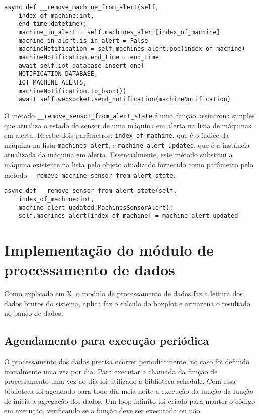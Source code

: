 \begin{verbatim}
async def __remove_machine_from_alert(self,
    index_of_machine:int,
    end_time:datetime):
    machine_in_alert = self.machines_alert[index_of_machine]
    machine_in_alert.is_in_alert = False
    machineNotification = self.machines_alert.pop(index_of_machine)
    machineNotification.end_time = end_time
    await self.iot_database.insert_one(
    NOTIFICATION_DATABASE,
    IOT_MACHINE_ALERTS,
    machineNotification.to_bson())
    await self.websocket.send_notification(machineNotification)    
\end{verbatim}

O método \texttt{\_\_remove\_sensor\_from\_alert\_state} é uma função assíncrona simples que atualiza o estado do sensor de uma máquina em alerta na lista de máquinas em alerta. Recebe dois parâmetros: \texttt{index\_of\_machine}, que é o índice da máquina na lista \texttt{machines\_alert}, e \texttt{machine\_alert\_updated}, que é a instância atualizada da máquina em alerta. Essencialmente, este método substitui a máquina existente na lista pelo objeto atualizado fornecido como parâmetro pelo método \texttt{\_\_remove\_machine\_sensor\_from\_alert\_state}.

\begin{verbatim}
async def __remove_sensor_from_alert_state(self,
    index_of_machine:int,
    machine_alert_updated:MachinesSensorAlert):
    self.machines_alert[index_of_machine] = machine_alert_updated
\end{verbatim}



\section[Implementação do módulo de processamento de dados]{Implementação do módulo de processamento de dados}
Como explicado em X, o modulo de processamento de dados faz a leitura dos dados brutos do sistema, aplica faz o calculo do boxplot e armazena o resultado no banco de dados.

\subsection{Agendamento para execução periódica}
O processamento dos dados precisa ocorrer periodicamente, no caso foi definido inicialmente uma vez por dia. Para executar a chamada da função de processamento uma vez ao dia foi utilizado a biblioteca schedule. Com essa biblioteca foi agendado para todo dia meia noite a execução da função da função de inicia a agregação dos dados. Um loop infinito foi criado para manter o código em execução, verificando se a função deve ser executada ou não.

